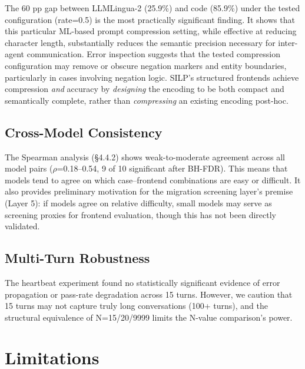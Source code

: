 \documentclass{article}
\begin{document}
The 60 pp gap between LLMLingua-2 (25.9\%) and code (85.9\%) under the tested configuration (rate=0.5) is the most practically significant finding. It shows that this particular ML-based prompt compression setting, while effective at reducing character length, substantially reduces the semantic precision necessary for inter-agent communication. Error inspection suggests that the tested compression configuration may remove or obscure negation markers and entity boundaries, particularly in cases involving negation logic. SILP's structured frontends achieve compression \emph{and} accuracy by \emph{designing} the encoding to be both compact and semantically complete, rather than \emph{compressing} an existing encoding post-hoc.



\subsection{Cross-Model Consistency}\label{cross-model-consistency}



The Spearman analysis (\S4.4.2) shows weak-to-moderate agreement across all model pairs ($\rho$=0.18--0.54, 9 of 10 significant after BH-FDR). This means that models tend to agree on which case--frontend combinations are easy or difficult. It also provides preliminary motivation for the migration screening layer's premise (Layer 5): if models agree on relative difficulty, small models may serve as screening proxies for frontend evaluation, though this has not been directly validated.



\subsection{Multi-Turn Robustness}\label{multi-turn-robustness}



The heartbeat experiment found no statistically significant evidence of error propagation or pass-rate degradation across 15 turns. However, we caution that 15 turns may not capture truly long conversations (100+ turns), and the structural equivalence of N=15/20/9999 limits the N-value comparison's power.



\section{Limitations}\label{limitations}
\end{document}
